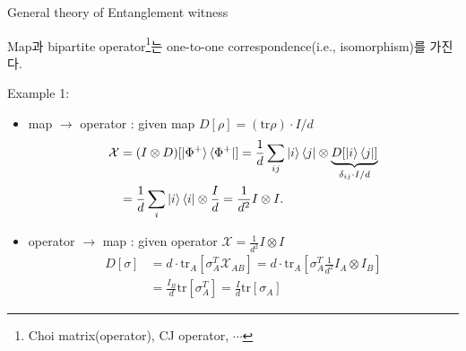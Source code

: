 \documentclass[9pt]{beamer}
\begin{document}
\begin{section}{General theory of  Entanglement witness}
\begin{frame}
            \begin{theorem}
                Map과 bipartite operator\footnote{Choi matrix(operator), CJ operator, $\cdots$}는 one-to-one correspondence(i.e., isomorphism)를 가진다.
            \end{theorem}
            Example 1:
            \begin{itemize}
                \item map $\rightarrow$ operator : given map $D[\rho] = (\text{tr} \rho) \cdot I/d$
                \begin{align*}
                    \mathcal X &= (I\otimes D) [\ket{\Phi^+}\bra{\Phi^+}] = \frac{1}{d}\sum_{ij} \ket{i}\bra{j} \otimes \underbrace{D[\ket i \bra j] }_{\delta_{ij} \cdot I/d}\\
                                &= \frac{1}{d}\sum_i \ket i \bra i \otimes \frac{I}{d} = \frac{1}{d^2} I \otimes I.
                \end{align*}
                \item operator $\rightarrow$ map : given operator $\mathcal X = \frac{1}{d^2} I \otimes I$
                \begin{align*}
                    D[\sigma] &= d \cdot \text{tr}_A [\sigma_A^T \mathcal{X}_{AB}]  = d \cdot \text{tr}_A [\sigma_A^T \frac{1}{d^2} I_A \otimes I_B] \\
                            & = \frac{I_B}{d} \text{tr}[\sigma_A^T] = \frac{I}{d} \text{tr} [\sigma_A]
                \end{align*}
            \end{itemize}
        \end{frame}


\end{section}
\end{document}

